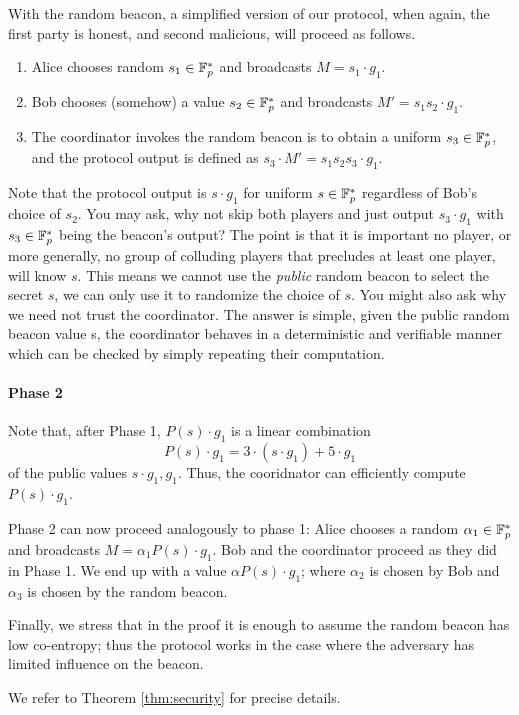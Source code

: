 \documentclass{article}
\begin{document}
With the random beacon, a simplified version of our protocol, when again, the first party is honest, and second malicious,
will proceed as follows.
\begin{enumerate}
 \item Alice chooses random $s_1\in {\mathbb F}_p^*$ and broadcasts $M=s_1\cdot g_1$.
\item Bob chooses (somehow) a value $s_2\in {\mathbb F}_p^*$ and broadcasts $M' =s_1 s_2 \cdot g_1$.
\item The  coordinator  invokes the random beacon is to obtain a uniform $ s_3\in {\mathbb F}_p^*$,
and the protocol output is defined as $s_3\cdot M' = s_1 s_2 s_3 \cdot g_1$. 
\end{enumerate}
Note that the protocol output is $s\cdot g_1$ for uniform $s\in {\mathbb F}_p^*$ regardless of Bob's choice of $s_2$.
You may ask, why not skip both players and just output $s_3\cdot g_1$ with $s_3\in{\mathbb F}_p^*$ being the beacon's output?
The point is that it is important no player, or more generally, no group of colluding players that precludes at least one player,
will know $s$. This means we cannot use the \emph{public} random beacon to select the secret $s$, we can only use it  to randomize the choice of $s$. You might also ask why we need not trust the coordinator. The answer is simple, given the public random beacon value s, the coordinator behaves in a deterministic and verifiable manner which can be checked by simply repeating their computation.


\paragraph*{Phase 2}
Note that, after Phase 1, $P(s)\cdot g_1$ is a linear combination  
\[P(s)\cdot g_1 = 3\cdot (s\cdot g_1) + 5\cdot g_1\]
of the public values $s\cdot g_1,g_1$.
Thus, the cooridnator can efficiently compute $P(s)\cdot g_1$.

Phase 2 can now proceed analogously to phase 1:
Alice chooses a random $\alpha_1\in {\mathbb F}_p^*$ and broadcasts $M=\alpha_1 P(s)\cdot g_1$. Bob and the coordinator
proceed as they did in Phase 1.
We end up with a value $\alpha P(s)\cdot g_1$;
where $\alpha_2$ is chosen by Bob and $\alpha_3$ is chosen by the random beacon.


Finally, we stress that in the proof it is enough to assume the random beacon has low co-entropy;
thus the protocol works in the case where the adversary has limited influence on the beacon.

We refer to Theorem \ref{thm:security} for precise details.
\end{document}
